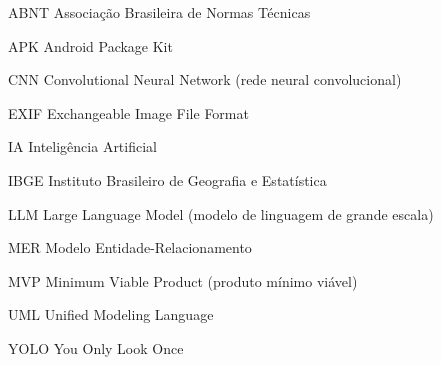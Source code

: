 \begin{siglas}
  \item[ABNT] Associação Brasileira de Normas Técnicas
  \item[APK] Android Package Kit
  \item[CNN] Convolutional Neural Network (rede neural convolucional)
  \item[EXIF] Exchangeable Image File Format
  \item[IA] Inteligência Artificial
  \item[IBGE] Instituto Brasileiro de Geografia e Estatística
  \item[LLM] Large Language Model (modelo de linguagem de grande escala)
  \item[MER] Modelo Entidade-Relacionamento
  \item[MVP] Minimum Viable Product (produto mínimo viável)
  \item[UML] Unified Modeling Language
  \item[YOLO] You Only Look Once
\end{siglas}
